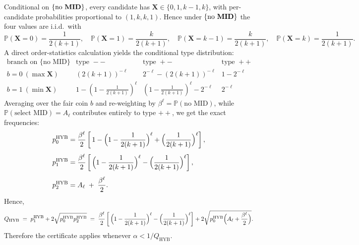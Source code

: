 \documentclass[11pt,reqno]{amsart}
\numberwithin{equation}{section}
\renewcommand{\vec}[1]{\boldsymbol{#1}}
\newcommand\vX{\vec X}
\newcommand\pr{\mathbb{P}}
\renewcommand\Pr{\pr}
\def\pr{{\mathbb P}}
\begin{document}
	Conditional on \(\{\text{no \textbf{MID}}\}\), every candidate has \(\vX\in\{0,1,k-1,k\}\), with per-candidate probabilities proportional to \((1,k,k,1)\). Hence under \(\{\text{no \textbf{MID}}\}\) the four values are i.i.d.\ with
	\[
	\Pr(\vX=0)=\frac{1}{2(k+1)},\quad
	\Pr(\vX=1)=\frac{k}{2(k+1)},\quad
	\Pr(\vX=k-1)=\frac{k}{2(k+1)},\quad
	\Pr(\vX=k)=\frac{1}{2(k+1)}.
	\]
	A direct order-statistics calculation yields the conditional type distribution:
	\[
	\begin{array}{c|ccc}
		\text{branch on }\{\text{no MID}\} & \text{type }-- & \text{type }+- & \text{type }++\\\hline
		b=0\ (\max \vX) & (2(k{+}1))^{-\ell} & 2^{-\ell}-(2(k{+}1))^{-\ell} & 1-2^{-\ell}\\
		b=1\ (\min \vX) & 1-\left(1-\tfrac{1}{2(k+1)}\right)^\ell & \left(1-\tfrac{1}{2(k+1)}\right)^\ell-2^{-\ell} & 2^{-\ell}
	\end{array}
	\]
	Averaging over the fair coin \(b\) and re-weighting by \(\beta^\ell=\Pr(\text{no MID})\), while \(\Pr(\text{select MID})=A_\ell\) contributes entirely to type \(++\), we get the exact frequencies:
	\begin{equation}\label{eq:p012-hyb}
			\begin{aligned}
				p_0^{\mathrm{HYB}} &= \frac{\beta^\ell}{2}\left[\,1-\Bigl(1-\frac{1}{2(k+1)}\Bigr)^\ell + \Bigl(\frac{1}{2(k+1)}\Bigr)^\ell\right],\\[4pt]
				p_1^{\mathrm{HYB}} &= \frac{\beta^\ell}{2}\left[\,\Bigl(1-\frac{1}{2(k+1)}\Bigr)^\ell - \Bigl(\frac{1}{2(k+1)}\Bigr)^\ell\right],\\[4pt]
				p_2^{\mathrm{HYB}} &= A_\ell \;+\;\frac{\beta^\ell}{2}.
			\end{aligned}
	\end{equation}
	 Hence,
	\begin{equation}\label{eq:Q-hyb}
		Q_{\mathrm{HYB}} \;=\; p_1^{\mathrm{HYB}} + 2\sqrt{p_0^{\mathrm{HYB}}p_2^{\mathrm{HYB}}}
		\;=\;\frac{\beta^\ell}{2}\left[\,\Bigl(1-\frac{1}{2(k+1)}\Bigr)^\ell - \Bigl(\frac{1}{2(k+1)}\Bigr)^\ell\right]
		+2\sqrt{p_0^{\mathrm{HYB}}\Bigl(A_\ell+\frac{\beta^\ell}{2}\Bigr)}.
	\end{equation}
	Therefore the certificate applies whenever \(\alpha<1/Q_{\mathrm{HYB}}\).
	
\end{document}
